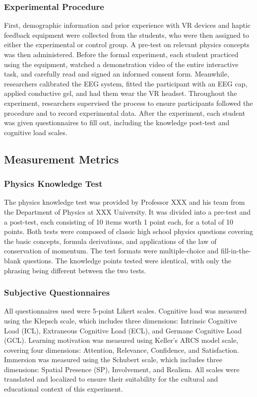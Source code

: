\documentclass[runningheads]{llncs}
\begin{document}
\subsubsection{Experimental Procedure}
First, demographic information and prior experience with VR devices and haptic feedback equipment were collected from the students, who were then assigned to either the experimental or control group. A pre-test on relevant physics concepts was then administered. Before the formal experiment, each student practiced using the equipment, watched a demonstration video of the entire interactive task, and carefully read and signed an informed consent form. Meanwhile, researchers calibrated the EEG system, fitted the participant with an EEG cap, applied conductive gel, and had them wear the VR headset. Throughout the experiment, researchers supervised the process to ensure participants followed the procedure and to record experimental data. After the experiment, each student was given questionnaires to fill out, including the knowledge post-test and cognitive load scales.

\subsection{Measurement Metrics}
\subsubsection{Physics Knowledge Test}
The physics knowledge test was provided by Professor XXX and his team from the Department of Physics at XXX University. It was divided into a pre-test and a post-test, each consisting of 10 items worth 1 point each, for a total of 10 points. Both tests were composed of classic high school physics questions covering the basic concepts, formula derivations, and applications of the law of conservation of momentum. The test formats were multiple-choice and fill-in-the-blank questions. The knowledge points tested were identical, with only the phrasing being different between the two tests.

\subsubsection{Subjective Questionnaires}
All questionnaires used were 5-point Likert scales. Cognitive load was measured using the Klepsch scale\cite{klepsch2017development}, which includes three dimensions: Intrinsic Cognitive Load (ICL), Extraneous Cognitive Load (ECL), and Germane Cognitive Load (GCL). Learning motivation was measured using Keller's ARCS model scale\cite{keiier1987systematic}, covering four dimensions: Attention, Relevance, Confidence, and Satisfaction. Immersion was measured using the Schubert scale\cite{schubert2001experience}, which includes three dimensions: Spatial Presence (SP), Involvement, and Realism. All scales were translated and localized to ensure their suitability for the cultural and educational context of this experiment.
\end{document}
